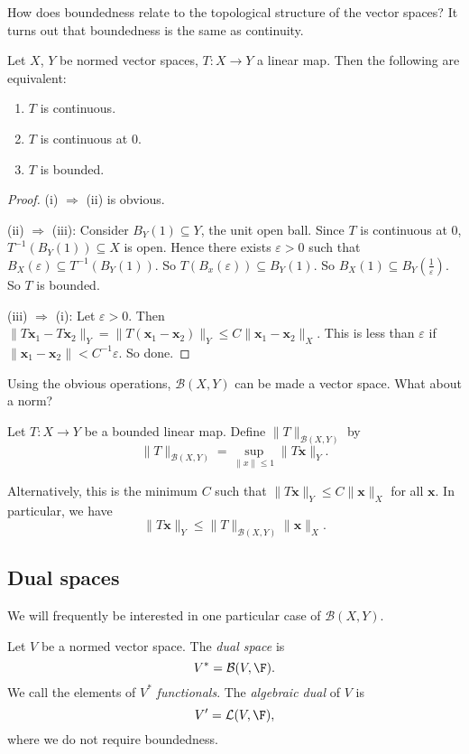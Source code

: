\documentclass[a4paper]{article}
\begin{document}
How does boundedness relate to the topological structure of the vector spaces? It turns out that boundedness is the same as continuity.

\begin{prop}
  Let $X$, $Y$ be normed vector spaces, $T: X\to Y$ a linear map. Then the following are equivalent:
  \begin{enumerate}
    \item $T$ is continuous.
    \item $T$ is continuous at 0.
    \item $T$ is bounded.
  \end{enumerate}
\end{prop}

\begin{proof}
  (i) $\Rightarrow$ (ii) is obvious.

  (ii) $\Rightarrow $ (iii): Consider $B_Y(1) \subseteq Y$, the unit open ball. Since $T$ is continuous at $0$, $T^{-1}(B_Y(1))\subseteq X$ is open. Hence there exists $\varepsilon > 0$ such that $B_X(\varepsilon) \subseteq T^{-1}(B_Y(1))$. So $T(B_x(\varepsilon)) \subseteq B_Y(1)$. So $B_X(1) \subseteq B_Y\left(\frac{1}{\varepsilon}\right)$. So $T$ is bounded.

  (iii) $\Rightarrow$ (i): Let $\varepsilon > 0$. Then $\|T \mathbf{x}_1 - T \mathbf{x}_2\|_Y = \|T(\mathbf{x}_1 - \mathbf{x}_2)\|_Y \leq C\|\mathbf{x}_1 - \mathbf{x}_2\|_X$. This is less than $\varepsilon$ if $\|\mathbf{x}_1 - \mathbf{x}_2\| < C^{-1}\varepsilon$. So done.
\end{proof}

Using the obvious operations, $\mathcal{B}(X, Y)$ can be made a vector space. What about a norm?

\begin{defi}
  Let $T: X\to Y$ be a bounded linear map. Define $\|T\|_{\mathcal{B}(X, Y)}$ by
  \[
    \|T\|_{\mathcal{B}(X, Y)} = \sup_{\|x\| \leq 1} \|T \mathbf{x}\|_Y.
  \]
\end{defi}
Alternatively, this is the minimum $C$ such that $\|T\mathbf{x}\|_Y \leq C\|\mathbf{x}\|_X$ for all $\mathbf{x}$. In particular, we have
\[
  \|T\mathbf{x}\|_Y \leq \|T\|_{\mathcal{B}(X, Y)}\|\mathbf{x}\|_X.
\]
\subsection{Dual spaces}
We will frequently be interested in one particular case of $\mathcal{B}(X, Y)$.
\begin{defi}
  Let $V$ be a normed vector space. The \emph{dual space} is
  \[
    V^* = \mathcal{B}(V, \F).
  \]
  We call the elements of $V^*$ \emph{functionals}. The \emph{algebraic dual} of $V$ is
  \[
    V' = \mathcal{L}(V, \F),
  \]
  where we do not require boundedness.
\end{defi}
\end{document}
